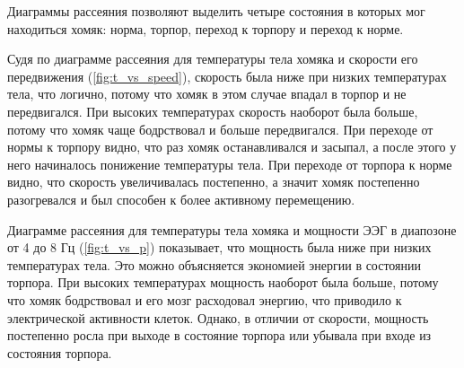 \documentclass[12pt,a4paper,oneside]{article}
\begin{document}
Диаграммы рассеяния позволяют выделить четыре состояния в которых мог находиться хомяк: норма, торпор, переход к торпору и переход к норме. 

Судя по диаграмме рассеяния для температуры тела хомяка и скорости его передвижения (\ref{fig:t_vs_speed}), скорость была ниже при низких температурах тела, что логично, потому что хомяк в этом случае впадал в торпор и не передвигался. При высоких температурах скорость наоборот была больше, потому что хомяк чаще бодрствовал и больше передвигался. При переходе от нормы к торпору видно, что раз хомяк останавливался и засыпал, а после этого у него начиналось понижение температуры тела. При переходе от торпора к норме видно, что скорость увеличивалась постепенно, а значит хомяк постепенно разогревался и был способен к более активному перемещению. 

Диаграмме рассеяния для температуры тела хомяка и мощности ЭЭГ в диапозоне от 4 до 8 Гц (\ref{fig:t_vs_p}) показывает, что мощность была ниже при низких температурах тела. Это можно объясняется экономией энергии в состоянии торпора. При высоких температурах мощность наоборот была больше, потому что хомяк бодрствовал и его мозг расходовал энергию, что приводило к электрической активности клеток. Однако, в отличии от скорости, мощность постепенно росла при выходе в состояние торпора или убывала при входе из состояния торпора. 
\end{document}
